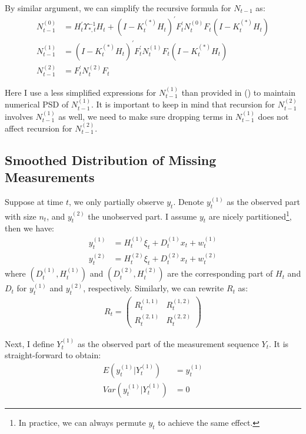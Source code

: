 \documentclass[10pt, titlepage]{article}
\numberwithin{equation}{section}
\begin{document}
By similar argument, we can simplify the recursive formula for $N_{t-1}$ as: 
\begin{align}
    N_{t-1}^{(0)} &= H_t^{'}\Upsilon_{*,t}^{-1}H_t+(I-K_t^{(*)}H_t)^{'}F_t^{'}N_t^{(0)}F_t(I-K_t^{(*)}H_t) \label{eq:N_0_start} \\
    N_{t-1}^{(1)} &= (I-K_t^{(*)}H_t)^{'}F_t^{'}N_t^{(1)}F_t(I-K_t^{(*)}H_t) \\
    N_{t-1}^{(2)} &= F_t^{'}N_t^{(2)}F_t \label{eq:N_0_end}
\end{align}

Here I use a less simplified expressions for $N_{t-1}^{(1)}$ than provided in (\cite{durbin_koopman_2003}) to maintain numerical PSD of $N_{t-1}^{(1)}$. It is important to keep in mind that recursion for $N_{t-1}^{(2)}$ involves $N_{t-1}^{(1)}$ as well, we need to make sure dropping terms in $N_{t-1}^{(1)}$ does not affect recursion for $N_{t-1}^{(2)}$. 

\subsection{Smoothed Distribution of Missing Measurements} \label{ap:interp}
Suppose at time $t$, we only partially observe $y_t$. Denote $y_t^{(1)}$ as the observed part with size $n_t$, and $y_t^{(2)}$ the unobserved part. I assume $y_t$ are nicely partitioned\footnote{In practice, we can always permute $y_t$ to achieve the same effect.}, then we have:
\begin{align*}
    y_t^{(1)} &= H_t^{(1)}\xi_t + D_t^{(1)}x_t + w_t^{(1)} \\
    y_t^{(2)} &= H_t^{(2)}\xi_t + D_t^{(2)}x_t + w_t^{(2)} 
\end{align*}
where $(D_t^{(1)}, H_t^{(1)})$ and $(D_t^{(2)}, H_t^{(2)})$ are the corresponding part of $H_t$ and $D_t$ for $y_t^{(1)}$ and $y_t^{(2)}$, respectively. Similarly, we can rewrite $R_t$ as:
\begin{align*}
    R_t = \begin{pmatrix}
        R_t^{(1, 1)} & R_t^{(1, 2)} \\
        R_t^{(2, 1)} & R_t^{(2, 2)}
    \end{pmatrix}
\end{align*}

Next, I define $Y_t^{(1)}$ as the observed part of the measurement sequence $Y_t$. It is straight-forward to obtain: 
\begin{align}
    E(y_t^{(1)}|Y_t^{(1)}) &= y_t^{(1)} \\
    Var(y_t^{(1)}|Y_t^{(1)}) &= 0 
\end{align}
\end{document}
